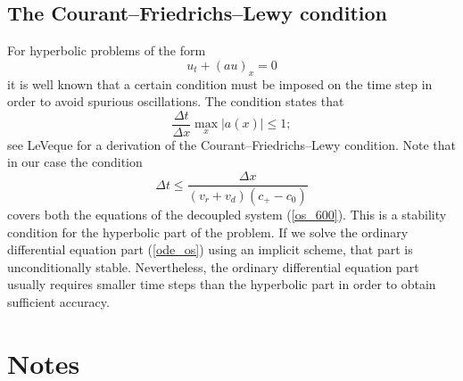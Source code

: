 \subsection{The Courant--Friedrichs--Lewy condition}
For hyperbolic problems of the form 
\begin{equation}
u_{t}+\left(  au\right)  _{x}=0
\end{equation}
it is well known that a certain condition must be imposed on the time step in order to avoid spurious oscillations. The condition states that 
\begin{equation}
\frac{\Delta t}{\Delta x} \max_x \vert a(x)\vert \le 1; \label{CFL}
\end{equation}
see LeVeque \cite{LeVeque2002} for a derivation of the Courant--Friedrichs--Lewy condition. Note that in our case the condition\begin{equation}
\Delta t\le \frac{\Delta x}{(v_r+v_d)(c_+ -c_0)} \label{CFL2}
\end{equation}
covers both the equations of the decoupled system (\ref{os_600}). This is a stability condition for the hyperbolic part of the problem. If we solve the ordinary differential equation part (\ref{ode_os}) using an implicit scheme, that part is unconditionally stable. Nevertheless, the ordinary differential equation part usually requires smaller time steps than the hyperbolic part in order to obtain sufficient accuracy. 



\section{Notes \label{notes_Ca_1D}}

